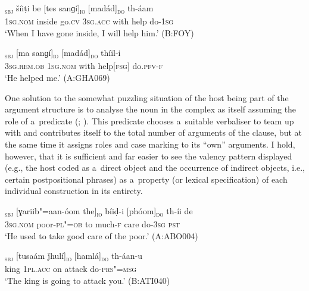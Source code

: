 \begin{exe}
\ex
\label{ex:12-77}
\gll [ma]\textsubscript{\textsc{sbj}} šíiṭi be [tes sanɡí]\textsubscript{\textsc{io}} [madád]\textsubscript{\textsc{do}} th-áam  \\
\textsc{1sg.nom} inside go.\textsc{cv} \textsc{3sg.acc} with help do-\textsc{1sg} \\
\glt `When I have gone inside, I will help him.' (B:FOY)
\end{exe}
\begin{exe}
\ex
\label{ex:12-78}
\gll [eetíi]\textsubscript{\textsc{sbj}} [ma sanɡí]\textsubscript{\textsc{io}} [madád]\textsubscript{\textsc{do}} thíil-i  \\
\textsc{3sg.rem.ob} \textsc{1sg.nom} with help[\textsc{fsg]} do.\textsc{pfv-f}  \\
\glt `He helped me.' (A:GHA069)
\end{exe}

One solution to the somewhat puzzling situation of the host being part of the argument structure is to analyse the noun in the complex as itself assuming the role of a~predicate (\citealt[204--212]{verma1993}; \citealt[164--170]{mohanan1993}). This predicate chooses a~suitable verbaliser to team up with and contributes itself to the total number of arguments of the clause, but at the same time it assigns roles and case marking to its ``own'' arguments. I hold, however, that it is sufficient and far easier to see the valency pattern displayed (e.g., the host coded as a~direct object and the occurrence of indirect objects, i.e., certain postpositional phrases) as a~property (or lexical specification) of each individual construction in its entirety. 

\begin{exe}
\ex
\label{ex:12-79}
\gll [so]\textsubscript{\textsc{sbj}} [ɣariib"=aan-óom the]\textsubscript{\textsc{io}} bíiḍ-i [phóom]\textsubscript{\textsc{do}} th-íi de  \\
\textsc{3sg.nom} poor-\textsc{pl"=ob} to much-\textsc{f} care do-\textsc{3sg}  \textsc{pst} \\
\glt `He used to take good care of the poor.' (A:ABO004)
\end{exe}
\begin{exe}
\ex
\label{ex:12-80}
\gll [ṣuú]\textsubscript{\textsc{sbj}} [tusaám ǰhulí]\textsubscript{\textsc{io}} [hamlá]\textsubscript{\textsc{do}} th-áan-u  \\
king \textsc{1pl.acc} on attack do-\textsc{prs"=msg}  \\
\glt `The king is going to attack you.' (B:ATI040)
\end{exe}

